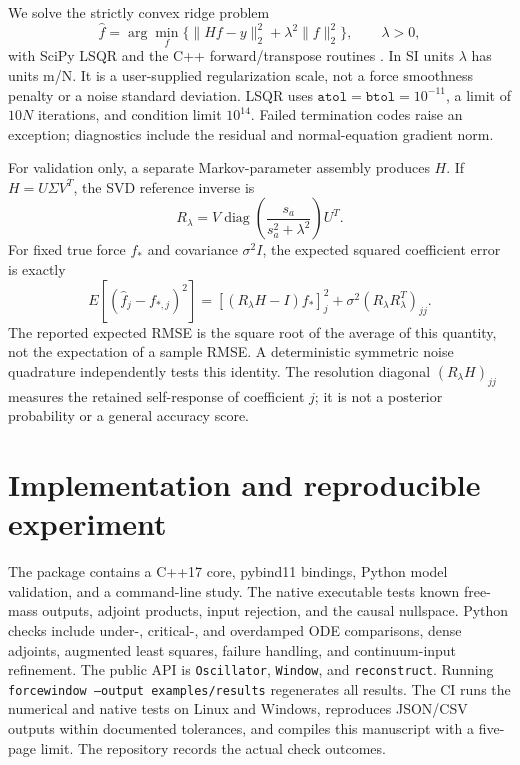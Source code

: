 \documentclass[10pt,a4paper]{article}
\begin{document}
We solve the strictly convex ridge problem
\begin{equation}
 \widehat f=\arg\min_f\{\|Hf-y\|_2^2+\lambda^2\|f\|_2^2\},
 \qquad\lambda>0,
 \label{eq:ridge}
\end{equation}
with SciPy LSQR and the C++ forward/transpose routines \cite{paige,scipyLSQR}.
In SI units $\lambda$ has units m/N. It is a user-supplied regularization
scale, not a force smoothness penalty or a noise standard deviation. LSQR
uses $\mathtt{atol}=\mathtt{btol}=10^{-11}$, a limit of $10N$ iterations,
and condition limit $10^{14}$. Failed termination codes raise an exception;
diagnostics include the residual and normal-equation gradient norm.

For validation only, a separate Markov-parameter assembly produces $H$.
If $H=U\Sigma V^T$, the SVD reference inverse is
\begin{equation}
 R_\lambda=V\operatorname{diag}\!\left(\frac{s_a}{s_a^2+\lambda^2}\right)U^T.
\end{equation}
For fixed true force $f_*$ and covariance $\sigma^2I$, the expected squared
coefficient error is exactly
\begin{equation}
 E[(\widehat f_j-f_{*,j})^2]
 =[(R_\lambda H-I)f_*]_j^2+\sigma^2(R_\lambda R_\lambda^T)_{jj}.
 \label{eq:risk}
\end{equation}
The reported expected RMSE is the square root of the average of this quantity,
not the expectation of a sample RMSE. A deterministic symmetric noise
quadrature independently tests this identity. The resolution diagonal
$(R_\lambda H)_{jj}$ measures the retained self-response of coefficient $j$;
it is not a posterior probability or a general accuracy score.

\section{Implementation and reproducible experiment}
The package contains a C++17 core, pybind11 bindings, Python model validation,
and a command-line study. The native executable tests known free-mass outputs,
adjoint products, input rejection, and the causal nullspace. Python checks
include under-, critical-, and overdamped ODE comparisons, dense adjoints,
augmented least squares, failure handling, and continuum-input refinement.
The public API is \texttt{Oscillator}, \texttt{Window}, and \texttt{reconstruct}.
Running \texttt{forcewindow --output examples/results} regenerates all results.
The CI runs the numerical and native tests on Linux and Windows, reproduces
JSON/CSV outputs within documented tolerances, and compiles this manuscript
with a five-page limit. The repository records the actual check outcomes.
\end{document}
